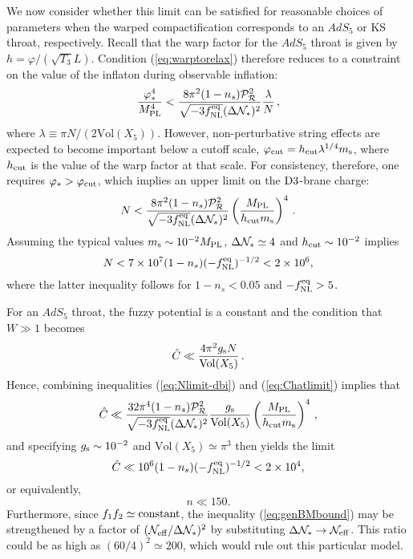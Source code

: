 We now consider whether this limit can be satisfied for reasonable choices 
of parameters when the warped compactification corresponds to 
an $AdS_5$ or KS throat, respectively. Recall that the warp 
factor for the $AdS_5$ throat is given by $h=\varphi/(\sqrt{T_3}L)$.  
Condition (\ref{eq:warptorelax}) therefore reduces to a constraint on the 
value of the inflaton during observable inflation: 
% 
\begin{equation}
\label{eq:phivalue-dbi}
\frac{\varphi_*^4}{M_{\mathrm{PL}}^4} < 
\frac{8\pi^2 (1-n_s)\mathcal{P}_{\mathcal{R}}^2 }{\sqrt{-3f_{\mathrm{NL}}^{\mathrm{eq}}} ( \Delta \mathcal{N}_*)^2} 
\frac{\lambda}{N} \,,
\end{equation}
%  
where $\lambda \equiv \pi N/(2 \mathrm{Vol}(X_5))$. 
However, non-perturbative string effects are expected to become 
important below a cutoff scale, $\varphi_{\rm cut} = 
h_{\rm cut} \lambda^{1/4} m_\mathrm{s}$, where $h_{\rm cut}$ is the value of the 
warp factor at that scale. For consistency, therefore, one requires 
$\varphi_*>\varphi_{\rm cut}$, which implies an upper limit on the 
${\rm D3}$-brane charge: 
% 
\begin{equation}
\label{eq:Nlimit-dbi}
N< \frac{8\pi^2 (1-n_s)\mathcal{P}_{\mathcal{R}}^2 }{\sqrt{-3f_{\mathrm{NL}}^{\mathrm{eq}}} ( \Delta \mathcal{N}_*)^2}
\left( \frac{M_{\mathrm{PL}}}{h_{\rm cut}m_\mathrm{s}} \right)^4  \,.
\end{equation}
% 
Assuming the typical values $m_\mathrm{s} \sim 10^{-2}M_{\mathrm{PL}}$, 
$\Delta \mathcal{N}_* \simeq 4$ and 
$h_{\rm cut} \sim 10^{-2}$ implies
%   
\begin{equation}
N < 7 \times 10^7 (1-n_s)(-f_{\mathrm{NL}}^{\mathrm{eq}})^{-1/2} < 2\times 10^6, 
\end{equation}
% 
where 
the latter inequality follows for $1-n_s <0.05$ and $-f_{\mathrm{NL}}^{\mathrm{eq}}>5$. 


For an $AdS_5$ throat, the fuzzy potential 
is a constant and the condition that $W \gg 1$ becomes 
% 
\begin{equation}
\label{eq:Chatlimit}
\hat{C} \ll \frac{4\pi^2g_\mathrm{s} N}{\mathrm{Vol}(X_5)} \,.
\end{equation}
% 
Hence, combining inequalities 
(\ref{eq:Nlimit-dbi}) and (\ref{eq:Chatlimit}) implies that
%  
\begin{equation}
\label{eq:nlimit-dbi}
\hat{C} \ll 
\frac{32 \pi^4 (1-n_s)\mathcal{P}_{\mathcal{R}}^2 }{\sqrt{-3f_{\mathrm{NL}}^{\mathrm{eq}}} ( \Delta \mathcal{N}_*)^2}
\frac{g_\mathrm{s}}{\mathrm{Vol} (X_5) }
\left( \frac{M_{\mathrm{PL}}}{h_{\rm cut}m_\mathrm{s}} \right)^4  \,,
\end{equation}
% 
and specifying $g_\mathrm{s} \sim 10^{-2}$ and 
$\mathrm{Vol}(X_5) \simeq \pi^3$ then yields the limit  
% 
\begin{equation}
\hat{C} \ll 10^{6} (1-n_s)(-f_{\mathrm{NL}}^{\mathrm{eq}})^{-1/2} < 2 \times 10^4,
\end{equation}
% 
 or equivalently,
%   
\begin{equation}
n \ll 150.
\end{equation}
% 
Furthermore, since $f_1f_2 \simeq {\rm constant}$, 
the inequality (\ref{eq:genBMbound}) may be strengthened by a 
factor of $(   \mathcal{N}_\mathrm{eff} /\Delta \mathcal{N}_*)^2$ by 
substituting 
$\Delta \mathcal{N}_* \rightarrow \mathcal{N}_\mathrm{eff}$. This ratio 
could be as 
high as $(60/4)^2 \simeq 200 $, which would rule out this particular
model. 


